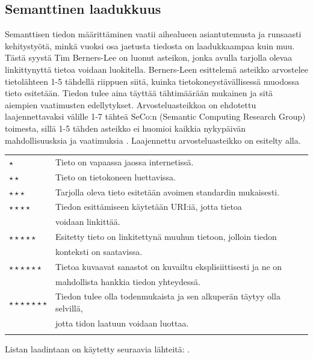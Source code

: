 \documentclass[finnish, 12pt, a4paper, elec, utf8, pdfa, online]{aaltothesis}
\begin{document}
{\subsection{Semanttinen laadukkuus} %
Semanttisen tiedon määrittäminen vaatii aihealueen asiantutemusta ja runsaasti kehitystyötä, minkä vuoksi osa jaetusta tiedosta on laadukkaampaa kuin muu. Tästä syystä Tim Berners-Lee on luonut asteikon, jonka avulla tarjolla olevaa linkittynyttä tietoa voidaan luokitella. Berners-Leen esittelemä asteikko arvostelee tietolähteen 1-5 tähdellä riippuen siitä, kuinka tietokoneystävällisessä muodossa tieto esitetään. Tiedon tulee aina täyttää tähtimäärään mukainen ja sitä aiempien vaatimusten edellytykset. Arvosteluasteikkoa on ehdotettu laajennettavaksi välille 1-7 tähteä SeCo:n (Semantic Computing Research Group) toimesta, sillä 1-5 tähden asteikko ei huomioi kaikkia nykypäivän mahdollisuusksia ja vaatimuksia \cite{SeCo_stars}. Laajennettu arvosteluasteikko on esitelty alla.

\begin{tabular}{ll}
\vspace*{0.2cm}
$\star$                     & Tieto on vapaassa jaossa internetissä. \\
\vspace*{0.2cm}
$\star \star$                & Tieto on tietokoneen luettavissa. \\
\vspace*{0.2cm}
$\star\star\star$           & Tarjolla oleva tieto esitetään avoimen standardin mukaisesti. \\

$\star\star\star\star$      & Tiedon esittämiseen käytetään URI:iä, jotta tietoa \\
\vspace*{0.2cm}             & voidaan linkittää. \\
$\star\star\star\star\star$ & Esitetty tieto on linkitettynä muuhun tietoon, jolloin tiedon \\        \vspace*{0.5cm}             & konteksti on saatavissa. \\
$\star\star\star\star\star\star$     & Tietoa kuvaavat sanastot on kuvailtu eksplisiittisesti ja ne on\\   \vspace*{0.2cm}               & mahdollista hankkia tiedon yhteydessä. \\
$\star\star\star\star\star\star\star$   & Tiedon tulee olla todenmukaista ja sen alkuperän täytyy olla selvillä, \\                & jotta tidon laatuun voidaan luottaa. \\ \vspace*{0.05cm}
\end{tabular}
Listan laadintaan on käytetty seuraavia lähteitä: \cite{SeCo_stars} \cite{SeCo_stars2} \cite{Tim-BL}.

}
\end{document}
